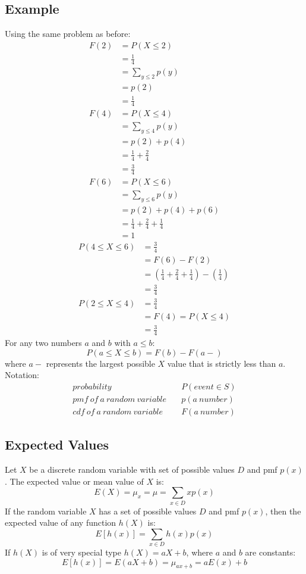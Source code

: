 \documentclass[letterpaper, 12pt]{math}
\begin{document}
\subsection*{Example}
Using the same problem as before:
\begin{align*}
  F(2) &= P(X\leq 2) \\
  &= \frac{1}{4} \\
  &= \sum_{y\leq 2}p(y) \\
  &= p(2) \\
  &= \frac{1}{4} \\
  F(4) &= P(X\leq 4) \\
  &= \sum_{y\leq 4}p(y) \\
  &= p(2)+p(4) \\
  &= \frac{1}{4}+\frac{2}{4} \\
  &= \frac{3}{4} \\
  F(6) &= P(X\leq 6) \\
  &= \sum_{y\leq 6}p(y) \\
  &= p(2)+p(4)+p(6) \\
  &= \frac{1}{4}+\frac{2}{4}+\frac{1}{4} \\
  &= 1
\end{align*}
\begin{align*}
  P(4\leq X\leq 6) &= \frac{3}{4} \\
  &= F(6)-F(2) \\
  &= (\frac{1}{4}+\frac{2}{4}+\frac{1}{4})-(\frac{1}{4}) \\
  &= \frac{3}{4} \\
  P(2\leq X\leq 4) &= \frac{3}{4} \\
  &= F(4) = P(X\leq 4) \\
  &= \frac{3}{4}
\end{align*}
For any two numbers \( a \) and \( b \) with \( a \leq b \):
\[ P(a\leq X\leq b) = F(b)-F(a-) \]
where \( a- \) represents the largest possible \( X \) value that is strictly
less than \( a \). Notation:
\begin{align*}
  probability \quad & P(event\in S) \\
  pmf\ of\ a\ random\ variable \quad & p(a\ number) \\
  cdf\ of\ a\ random\ variable \quad & F(a\ number)
\end{align*}

\subsection*{Expected Values}
Let \( X \) be a discrete random variable with set of possible values \( D \)
and pmf \( p(x) \). The expected value or mean value of \( X \) is:
\[ E(X) = \mu_{x} = \mu = \sum_{x\in D}xp(x) \]
If the random variable \( X \) has a set of possible values \( D \) and
pmf \( p(x) \), then the expected value of any function \( h(X) \) is:
\[ E[h(x)] = \sum_{x\in D}h(x)p(x) \]
If \( h(X) \) is of very special type \( h(X) = aX+b \), where \( a \) and
\( b \) are constants:
\[ E[h(x)] = E(aX+b) = \mu_{ax+b} = aE(x)+b \]
\end{document}
